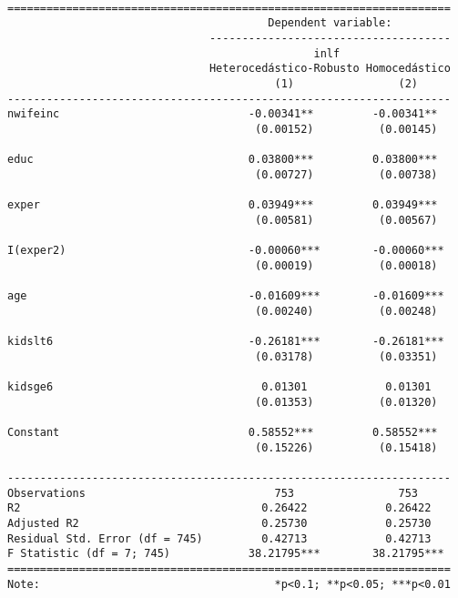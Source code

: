 \documentclass[
  letterpaper,
  DIV=11,
  numbers=noendperiod]{scrreprt}
\begin{document}
\begin{verbatim}

====================================================================
                                        Dependent variable:         
                               -------------------------------------
                                               inlf                 
                               Heterocedástico-Robusto Homocedástico
                                         (1)                (2)     
--------------------------------------------------------------------
nwifeinc                             -0.00341**         -0.00341**  
                                      (0.00152)          (0.00145)  
                                                                    
educ                                 0.03800***         0.03800***  
                                      (0.00727)          (0.00738)  
                                                                    
exper                                0.03949***         0.03949***  
                                      (0.00581)          (0.00567)  
                                                                    
I(exper2)                            -0.00060***        -0.00060*** 
                                      (0.00019)          (0.00018)  
                                                                    
age                                  -0.01609***        -0.01609*** 
                                      (0.00240)          (0.00248)  
                                                                    
kidslt6                              -0.26181***        -0.26181*** 
                                      (0.03178)          (0.03351)  
                                                                    
kidsge6                                0.01301            0.01301   
                                      (0.01353)          (0.01320)  
                                                                    
Constant                             0.58552***         0.58552***  
                                      (0.15226)          (0.15418)  
                                                                    
--------------------------------------------------------------------
Observations                             753                753     
R2                                     0.26422            0.26422   
Adjusted R2                            0.25730            0.25730   
Residual Std. Error (df = 745)         0.42713            0.42713   
F Statistic (df = 7; 745)            38.21795***        38.21795*** 
====================================================================
Note:                                    *p<0.1; **p<0.05; ***p<0.01
\end{verbatim}
\end{document}

